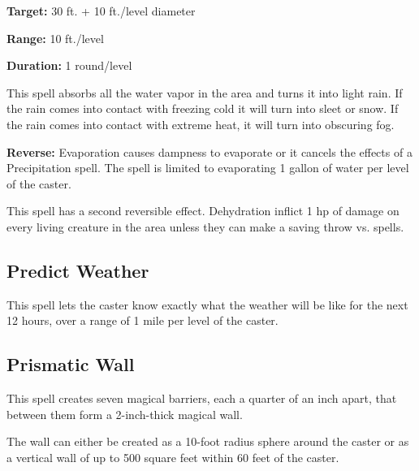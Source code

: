 \begin{multicols*}{2}
{\textbf{Target:} 30 ft. + 10 ft./level diameter

\textbf{Range:} 10 ft./level

\textbf{Duration:} 1 round/level}

This spell absorbs all the water vapor in the area and turns it into light rain. If the rain comes into contact with freezing cold it will turn into sleet or snow. If the rain comes into contact with extreme heat, it will turn into obscuring fog.

\textbf{Reverse:} \hypertarget{spell:Evaporation}{Evaporation} causes dampness to evaporate or it cancels the effects of a Precipitation spell. The spell is limited to evaporating 1 gallon of water per level of the caster.

This spell has a second reversible effect. \hypertarget{spell:Dehydration}{Dehydration} inflict 1 hp of damage on every living creature in the area unless they can make a saving throw vs. spells.

\subsection{Predict Weather}\label{spell:Predict Weather}

This spell lets the caster know exactly what the weather will be like for the next 12 hours, over a range of 1 mile per level of the caster.

\subsection{Prismatic Wall}\label{spell:Prismatic Wall}

This spell creates seven magical barriers, each a quarter of an inch apart, that between them form a 2-inch-thick magical wall.

The wall can either be created as a 10-foot radius sphere around the caster or as a vertical wall of up to 500 square feet within 60 feet of the caster.


\end{multicols*}
